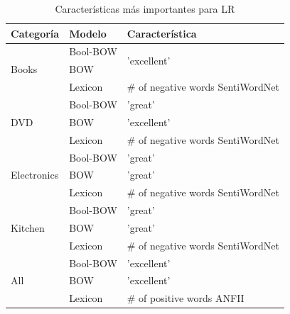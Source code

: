 \begin{table}[]
\centering
\caption{Características más importantes para LR}
\label{tab:LR-features}
\begin{tabular}{|l|l|l|}
\hline
\textbf{Categoría}           & \textbf{Modelo} & \textbf{Característica}            \\ \hline
\multirow{3}{*}{Books}       & Bool-BOW        & \multirow{2}{*}{'excellent'}       \\ \cline{2-2}
                             & BOW             &                                    \\ \cline{2-3} 
                             & Lexicon         & \# of negative words  SentiWordNet \\ \hline
\multirow{3}{*}{DVD}         & Bool-BOW        & 'great'                            \\ \cline{2-3} 
                             & BOW             & 'excellent'                        \\ \cline{2-3} 
                             & Lexicon         & \# of negative words  SentiWordNet \\ \hline
\multirow{3}{*}{Electronics} & Bool-BOW        & 'great'                            \\ \cline{2-3} 
                             & BOW             & 'great'                            \\ \cline{2-3} 
                             & Lexicon         & \# of negative words  SentiWordNet \\ \hline
\multirow{3}{*}{Kitchen}     & Bool-BOW        & 'great'                            \\ \cline{2-3} 
                             & BOW             & 'great'                            \\ \cline{2-3} 
                             & Lexicon         & \# of negative words  SentiWordNet \\ \hline
\multirow{3}{*}{All}         & Bool-BOW        & 'excellent'                        \\ \cline{2-3} 
                             & BOW             & 'excellent'                        \\ \cline{2-3} 
                             & Lexicon         & \# of positive words ANFII         \\ \hline
\end{tabular}
\end{table}

